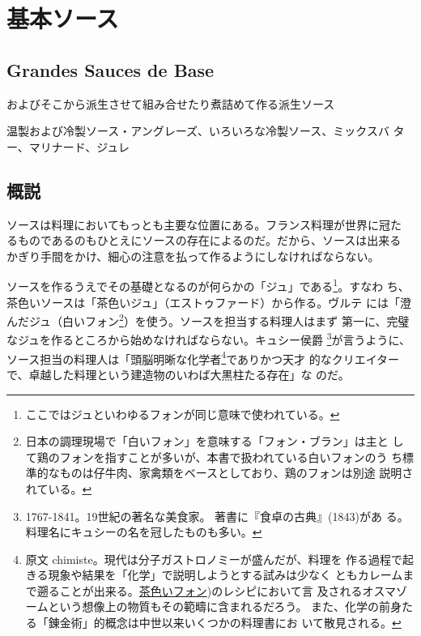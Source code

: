 \hypertarget{ux57faux672cux30bdux30fcux30b9}{%
\section{基本ソース}\label{ux57faux672cux30bdux30fcux30b9}}

\hypertarget{grandes-sauces-de-base}{%
\subsection{Grandes Sauces de Base}\label{grandes-sauces-de-base}}


およびそこから派生させて組み合せたり煮詰めて作る派生ソース

温製および冷製ソース・アングレーズ、いろいろな冷製ソース、ミックスバ
ター、マリナード、ジュレ

\hypertarget{ux6982ux8aac}{%
\subsection{概説}\label{ux6982ux8aac}}

ソースは料理においてもっとも主要な位置にある。フランス料理が世界に冠た
るものであるのもひとえにソースの存在によるのだ。だから、ソースは出来る
かぎり手間をかけ、細心の注意を払って作るようにしなければならない。

ソースを作るうえでその基礎となるのが何らかの「ジュ」である\footnote{ここではジュといわゆるフォンが同じ意味で使われている。}。すなわ
ち、茶色いソースは「茶色いジュ」（エストゥファード）から作る。ヴルテ
には「澄んだジュ（白いフォン\footnote{日本の調理現場で「白いフォン」を意味する「フォン・ブラン」は主と
  して鶏のフォンを指すことが多いが、本書で扱われている白いフォンのう
  ち標準的なものは仔牛肉、家禽類をベースとしており、鶏のフォンは別途
  説明されている。}）を使う。ソースを担当する料理人はまず
第一に、完璧なジュを作るところから始めなければならない。キュシー侯爵
\footnote{1767-1841。19世紀の著名な美食家。
  著書に『食卓の古典』(1843)があ
  る。料理名にキュシーの名を冠したものも多い。}が言うように、ソース担当の料理人は「頭脳明晰な化学者\footnote{原文
  chimiste。現代は分子ガストロノミーが盛んだが、料理を
  作る過程で起きる現象や結果を「化学」で説明しようとする試みは少なく
  ともカレームまで遡ることが出来る。\href{fonds-brun}{茶色いフォン})のレシピにおいて言
  及されるオスマゾームという想像上の物質もその範疇に含まれるだろう。
  また、化学の前身たる「錬金術」的概念は中世以来いくつかの料理書にお
  いて散見される。}でありかつ天才
的なクリエイターで、卓越した料理という建造物のいわば大黒柱たる存在」な
のだ。


